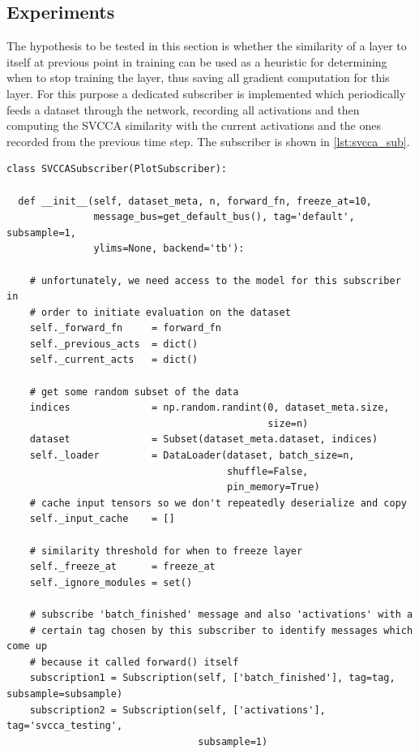 \subsection{Experiments}%
\label{sub:saturation-experiments}

The hypothesis to be tested in this section is whether the similarity of a layer
to itself at previous point in training can be used as a heuristic for
determining when to stop training the layer, thus saving all gradient
computation for this layer. For this purpose a dedicated subscriber is
implemented which periodically feeds a dataset through the network, recording
all activations and then computing the SVCCA similarity with the current
activations and the ones recorded from the previous time step. The subscriber is
shown in \cref{lst:svcca_sub}.

\begin{lstlisting}[label={lst:svcca_sub},
caption={SVCCA Subscriber}]
class SVCCASubscriber(PlotSubscriber):

  def __init__(self, dataset_meta, n, forward_fn, freeze_at=10,
               message_bus=get_default_bus(), tag='default', subsample=1,
               ylims=None, backend='tb'):

    # unfortunately, we need access to the model for this subscriber in
    # order to initiate evaluation on the dataset
    self._forward_fn     = forward_fn
    self._previous_acts  = dict()
    self._current_acts   = dict()

    # get some random subset of the data
    indices              = np.random.randint(0, dataset_meta.size,
                                             size=n)
    dataset              = Subset(dataset_meta.dataset, indices)
    self._loader         = DataLoader(dataset, batch_size=n,
                                      shuffle=False,
                                      pin_memory=True)
    # cache input tensors so we don't repeatedly deserialize and copy
    self._input_cache    = []

    # similarity threshold for when to freeze layer
    self._freeze_at      = freeze_at
    self._ignore_modules = set()

    # subscribe 'batch_finished' message and also 'activations' with a
    # certain tag chosen by this subscriber to identify messages which come up
    # because it called forward() itself
    subscription1 = Subscription(self, ['batch_finished'], tag=tag, subsample=subsample)
    subscription2 = Subscription(self, ['activations'], tag='svcca_testing',
                                 subsample=1)


\end{lstlisting}
